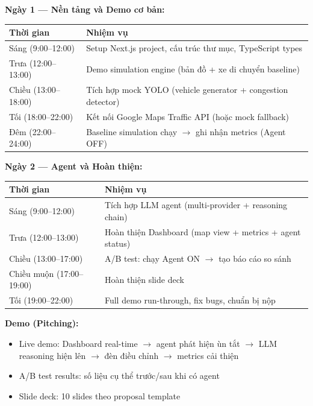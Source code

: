 \documentclass[12pt,a4paper]{article}
\begin{document}
\textbf{Ngày 1 — Nền tảng và Demo cơ bản:}

\begin{table}[ht]
    \centering
    \begin{tabular}{|m{3cm}|m{9.5cm}|}
        \hline
        \textbf{Thời gian} & \textbf{Nhiệm vụ} \\
        \hline
        Sáng (9:00--12:00) & Setup Next.js project, cấu trúc thư mục, TypeScript types \\
        \hline
        Trưa (12:00--13:00) & Demo simulation engine (bản đồ + xe di chuyển baseline) \\
        \hline
        Chiều (13:00--18:00) & Tích hợp mock YOLO (vehicle generator + congestion detector) \\
        \hline
        Tối (18:00--22:00) & Kết nối Google Maps Traffic API (hoặc mock fallback) \\
        \hline
        Đêm (22:00--24:00) & Baseline simulation chạy $\rightarrow$ ghi nhận metrics (Agent OFF) \\
        \hline
    \end{tabular}
\end{table}

\textbf{Ngày 2 — Agent và Hoàn thiện:}

\begin{table}[ht]
    \centering
    \begin{tabular}{|m{3cm}|m{9.5cm}|}
        \hline
        \textbf{Thời gian} & \textbf{Nhiệm vụ} \\
        \hline
        Sáng (9:00--12:00) & Tích hợp LLM agent (multi-provider + reasoning chain) \\
        \hline
        Trưa (12:00--13:00) & Hoàn thiện Dashboard (map view + metrics + agent status) \\
        \hline
        Chiều (13:00--17:00) & A/B test: chạy Agent ON $\rightarrow$ tạo báo cáo so sánh \\
        \hline
        Chiều muộn (17:00--19:00) & Hoàn thiện slide deck \\
        \hline
        Tối (19:00--22:00) & Full demo run-through, fix bugs, chuẩn bị nộp \\
        \hline
    \end{tabular}
\end{table}

\textbf{Demo (Pitching):}
\begin{itemize}
    \item Live demo: Dashboard real-time $\rightarrow$ agent phát hiện ùn tắt $\rightarrow$ LLM reasoning hiện lên $\rightarrow$ đèn điều chỉnh $\rightarrow$ metrics cải thiện
    \item A/B test results: số liệu cụ thể trước/sau khi có agent
    \item Slide deck: 10 slides theo proposal template
\end{itemize}
\end{document}
